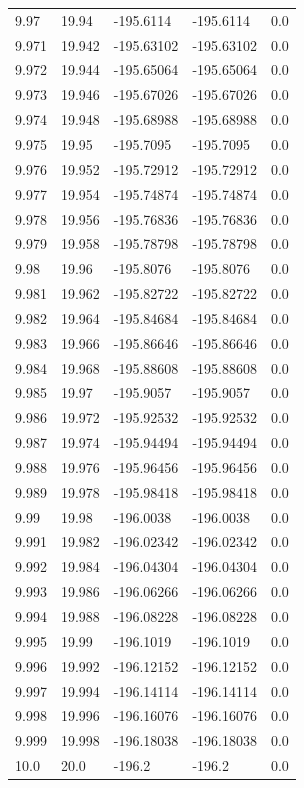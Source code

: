 \begin{tabular}{lllll}
9.97 & 19.94 & -195.6114 & -195.6114 & 0.0 \\
9.971 & 19.942 & -195.63102 & -195.63102 & 0.0 \\
9.972 & 19.944 & -195.65064 & -195.65064 & 0.0 \\
9.973 & 19.946 & -195.67026 & -195.67026 & 0.0 \\
9.974 & 19.948 & -195.68988 & -195.68988 & 0.0 \\
9.975 & 19.95 & -195.7095 & -195.7095 & 0.0 \\
9.976 & 19.952 & -195.72912 & -195.72912 & 0.0 \\
9.977 & 19.954 & -195.74874 & -195.74874 & 0.0 \\
9.978 & 19.956 & -195.76836 & -195.76836 & 0.0 \\
9.979 & 19.958 & -195.78798 & -195.78798 & 0.0 \\
9.98 & 19.96 & -195.8076 & -195.8076 & 0.0 \\
9.981 & 19.962 & -195.82722 & -195.82722 & 0.0 \\
9.982 & 19.964 & -195.84684 & -195.84684 & 0.0 \\
9.983 & 19.966 & -195.86646 & -195.86646 & 0.0 \\
9.984 & 19.968 & -195.88608 & -195.88608 & 0.0 \\
9.985 & 19.97 & -195.9057 & -195.9057 & 0.0 \\
9.986 & 19.972 & -195.92532 & -195.92532 & 0.0 \\
9.987 & 19.974 & -195.94494 & -195.94494 & 0.0 \\
9.988 & 19.976 & -195.96456 & -195.96456 & 0.0 \\
9.989 & 19.978 & -195.98418 & -195.98418 & 0.0 \\
9.99 & 19.98 & -196.0038 & -196.0038 & 0.0 \\
9.991 & 19.982 & -196.02342 & -196.02342 & 0.0 \\
9.992 & 19.984 & -196.04304 & -196.04304 & 0.0 \\
9.993 & 19.986 & -196.06266 & -196.06266 & 0.0 \\
9.994 & 19.988 & -196.08228 & -196.08228 & 0.0 \\
9.995 & 19.99 & -196.1019 & -196.1019 & 0.0 \\
9.996 & 19.992 & -196.12152 & -196.12152 & 0.0 \\
9.997 & 19.994 & -196.14114 & -196.14114 & 0.0 \\
9.998 & 19.996 & -196.16076 & -196.16076 & 0.0 \\
9.999 & 19.998 & -196.18038 & -196.18038 & 0.0 \\
10.0 & 20.0 & -196.2 & -196.2 & 0.0 \\
\bottomrule
\end{tabular}
